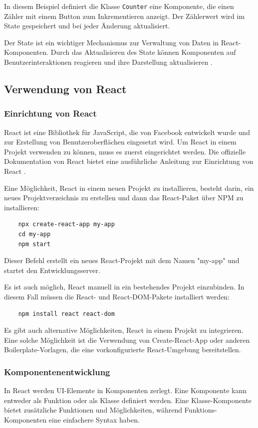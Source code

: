 In diesem Beispiel definiert die Klasse \verb|Counter| eine Komponente, die einen Zähler mit einem Button zum Inkrementieren anzeigt. Der Zählerwert wird im State gespeichert und bei jeder Änderung aktualisiert.

Der State ist ein wichtiger Mechanismus zur Verwaltung von Daten in React-Komponenten. Durch das Aktualisieren des State können Komponenten auf Benutzerinteraktionen reagieren und ihre Darstellung aktualisieren \cite{w3schools}.
\subsection{Verwendung von React}
\subsubsection{Einrichtung von React}
React ist eine Bibliothek für JavaScript, die von Facebook entwickelt wurde und zur Erstellung von Benutzeroberflächen eingesetzt wird. Um React in einem Projekt verwenden zu können, muss es zuerst eingerichtet werden. Die offizielle Dokumentation von React bietet eine ausführliche Anleitung zur Einrichtung von React \cite{ReactDocsSetup}.

Eine Möglichkeit, React in einem neuen Projekt zu installieren, besteht darin, ein neues Projektverzeichnis zu erstellen und dann das React-Paket über NPM zu installieren:

\begin{verbatim}
	npx create-react-app my-app
	cd my-app
	npm start
\end{verbatim}

Dieser Befehl erstellt ein neues React-Projekt mit dem Namen "my-app" und startet den Entwicklungsserver.

Es ist auch möglich, React manuell in ein bestehendes Projekt einzubinden. In diesem Fall müssen die React- und React-DOM-Pakete installiert werden:

\begin{verbatim}
	npm install react react-dom
\end{verbatim}

Es gibt auch alternative Möglichkeiten, React in einem Projekt zu integrieren. Eine solche Möglichkeit ist die Verwendung von Create-React-App oder anderen Boilerplate-Vorlagen, die eine vorkonfigurierte React-Umgebung bereitstellen.
\subsubsection{Komponentenentwicklung}
In React werden UI-Elemente in Komponenten zerlegt. Eine Komponente kann entweder als Funktion oder als Klasse definiert werden. Eine Klasse-Komponente bietet zusätzliche Funktionen und Möglichkeiten, während Funktions-Komponenten eine einfachere Syntax haben.

